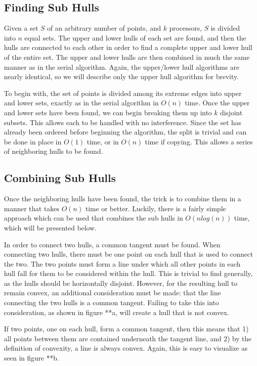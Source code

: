 \documentclass[conference]{IEEEtran}
\begin{document}
\subsection{Finding Sub Hulls}
Given a set $S$ of an arbitrary number of points, and $k$ processors, $S$ is divided into $n$ equal sets. The upper and lower hulls of each set are found, and then the hulls are connected to each other in order to find a complete upper and lower hull of the entire set. The upper and lower hulls are then combined in much the same manner as in the serial algorithm. Again, the upper/lower hull algorithms are nearly identical, so we will describe only the upper hull algorithm for brevity.

To begin with, the set of points is divided among its extreme edges into upper and lower sets, exactly as in the serial algorithm in $O(n)$ time. Once the upper and lower sets have been found, we can begin breaking them up into $k$ disjoint subsets. This allows each to be handled with no interference. Since the set has already been ordered before beginning the algorithm, the split is trivial and can be done in place in $O(1)$ time, or in $O(n)$ time if copying. This allows a series of neighboring hulls to be found. 

\subsection{Combining Sub Hulls}
Once the neighboring hulls have been found, the trick is to combine them in a manner that takes $O(n)$ time or better. Luckily, there is a fairly simple approach which can be used that combines the sub hulls in $O(nlog(n))$ time, which will be presented below.

In order to connect two hulls, a common tangent must be found. When connecting two hulls, there must be one point on each hull that is used to connect the two. The two points must form a line under which all other points in each hull fall for them to be considered within the hull. This is trivial to find generally, as the hulls should be horizontally disjoint. However, for the resulting hull to remain convex, an additional consideration must be made: that the line connecting the two hulls is a common tangent. Failing to take this into consideration, as shown in figure **a, will create a hull that is not convex.

If two points, one on each hull, form a common tangent, then this means that 1) all points between them are contained underneath the tangent line, and 2) by the definition of convexity, a line is always convex. Again, this is easy to visualize as seen in figure **b.
\end{document}

